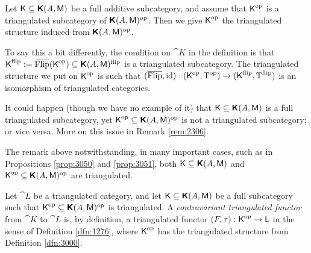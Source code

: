 \begin{dfn} \label{dfn:3000}
Let $\operatorname{\mathsf{K}} \subseteq \boldsymbol{\mathsf{K}}(A, \operatorname{\mathsf{M}})$ be a full additive subcategory, and 
assume that $\operatorname{\mathsf{K}}^{\mathrm{op}}$ is a triangulated subcategory of 
$\boldsymbol{\mathsf{K}}(A, \operatorname{\mathsf{M}})^{\mathrm{op}}$.
Then we give $\operatorname{\mathsf{K}}^{\mathrm{op}}$ the triangulated structure induced from 
$\boldsymbol{\mathsf{K}}(A, \operatorname{\mathsf{M}})^{\mathrm{op}}$.
\end{dfn}

To say this a bit differently, the condition on $\cat{K}$ in the definition is 
that 
$\operatorname{\mathsf{K}}^{\mathrm{flip}} := \overline{\operatorname{Flip}}(\operatorname{\mathsf{K}}^{\mathrm{op}})
\subseteq  \boldsymbol{\mathsf{K}}(A, \operatorname{\mathsf{M}})^{\mathrm{flip}}$ 
is a triangulated subcategory. The triangulated structure we put on 
$\operatorname{\mathsf{K}}^{\mathrm{op}}$ is such that 
$(\overline{\operatorname{Flip}}, \operatorname{id}) : (\operatorname{\mathsf{K}}^{\mathrm{op}}, \operatorname{T}^{\mathrm{op}})
\to (\operatorname{\mathsf{K}}^{\mathrm{flip}}, \operatorname{T}^{\mathrm{flip}})$
is an isomorphism of triangulated categories. 

\begin{rem} \label{rem:3170}
It could happen (though we have no example of it) that 
$\operatorname{\mathsf{K}} \subseteq \boldsymbol{\mathsf{K}}(A, \operatorname{\mathsf{M}})$ is a full triangulated subcategory, 
yet $\operatorname{\mathsf{K}}^{\mathrm{op}} \subseteq \boldsymbol{\mathsf{K}}(A, \operatorname{\mathsf{M}})^{\mathrm{op}}$ 
is not a triangulated subcategory; or vice versa. 
More on this issue in Remark \ref{rem:2306}. 
\end{rem}

The remark above notwithstanding, in many important cases, such as in 
Propositions \ref{prop:3050} and
\ref{prop:3051}, both $\operatorname{\mathsf{K}} \subseteq \boldsymbol{\mathsf{K}}(A, \operatorname{\mathsf{M}})$
and $\operatorname{\mathsf{K}}^{\mathrm{op}} \subseteq \boldsymbol{\mathsf{K}}(A, \operatorname{\mathsf{M}})^{\mathrm{op}}$
are triangulated. 

\begin{dfn} \label{dfn:2996}
Let $\cat{L}$ be a triangulated category, and let 
$\operatorname{\mathsf{K}} \subseteq \boldsymbol{\mathsf{K}}(A, \operatorname{\mathsf{M}})$ be a full subcategory 
such that $\operatorname{\mathsf{K}}^{\mathrm{op}} \subseteq \boldsymbol{\mathsf{K}}(A, \operatorname{\mathsf{M}})^{\mathrm{op}}$ is 
triangulated. A {\em contravariant triangulated functor}
from $\cat{K}$ to $\cat{L}$ is, by definition, a triangulated functor 
$(F, \tau) : \operatorname{\mathsf{K}}^{\mathrm{op}} \to \operatorname{\mathsf{L}}$
in the sense of Definition \ref{dfn:1276}, where $\operatorname{\mathsf{K}}^{\mathrm{op}}$ has the 
triangulated structure from Definition \ref{dfn:3000}.
\end{dfn}

